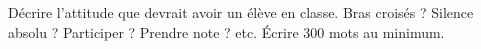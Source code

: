 
\begin{exercice}\label{exosmath-0425}

    Décrire l'attitude que devrait avoir un élève en classe. Bras croisés ? Silence absolu ? Participer ? Prendre note ? etc. Écrire 300 mots au minimum.

\end{exercice}
